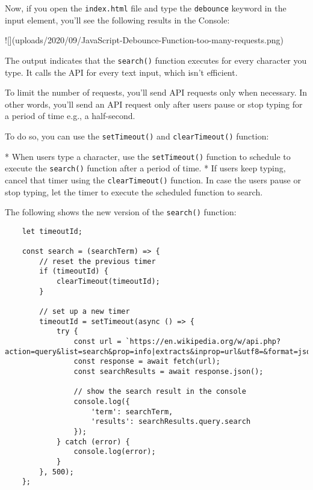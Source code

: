 \documentclass[11pt]{article}
\begin{document}
\noindent
Now, if you open the \verb|index.html| file and type the \verb|debounce| keyword in
the input element, you'll see the following results in the Console:

![](uploads/2020/09/JavaScript-Debounce-Function-too-many-requests.png)

\noindent
The output indicates that the \verb|search()| function executes for every
character you type. It calls the API for every text input,
which isn't efficient.
\newline

\noindent
To limit the number of requests, you'll send API requests only when
necessary. In other words, you'll send an API request only after users
pause or stop typing for a period of time e.g., a half-second.
\newline

\noindent
To do so, you can use the \verb|setTimeout()| and \verb|clearTimeout()| function:

* When users type a character, use the \verb|setTimeout()| function to schedule
to execute the \verb|search()| function after a period of time.
* If users keep typing, cancel that timer using the \verb|clearTimeout()| function.
In case the users pause or stop typing, let the timer to execute the
scheduled function to search.

\noindent
The following shows the new version of the \verb|search()| function:

\begin{lstlisting}
    let timeoutId;

    const search = (searchTerm) => {
        // reset the previous timer
        if (timeoutId) {
            clearTimeout(timeoutId);
        }

        // set up a new timer
        timeoutId = setTimeout(async () => {
            try {
                const url = `https://en.wikipedia.org/w/api.php?action=query&list=search&prop=info|extracts&inprop=url&utf8=&format=json&origin=*&srlimit=10&srsearch=${searchTerm}`;
                const response = await fetch(url);
                const searchResults = await response.json();

                // show the search result in the console
                console.log({
                    'term': searchTerm,
                    'results': searchResults.query.search
                });
            } catch (error) {
                console.log(error);
            }
        }, 500);
    };
\end{lstlisting}
\end{document}
